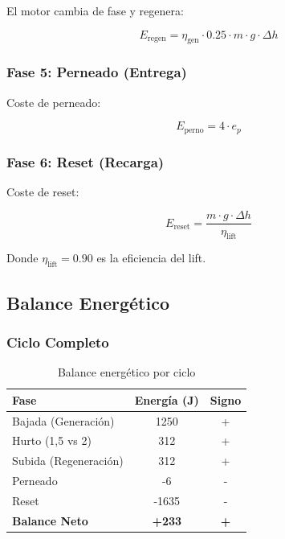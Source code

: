 \documentclass[12pt,a4paper]{article}
\begin{document}
El motor cambia de fase y regenera:

\begin{equation}
E_{\text{regen}} = \eta_{\text{gen}} \cdot 0.25 \cdot m \cdot g \cdot \Delta h
\end{equation}

\subsubsection{Fase 5: Perneado (Entrega)}

Coste de perneado:

\begin{equation}
E_{\text{perno}} = 4 \cdot e_p
\end{equation}

\subsubsection{Fase 6: Reset (Recarga)}

Coste de reset:

\begin{equation}
E_{\text{reset}} = \frac{m \cdot g \cdot \Delta h}{\eta_{\text{lift}}}
\end{equation}

Donde $\eta_{\text{lift}} = 0.90$ es la eficiencia del lift.

\subsection{Balance Energético}

\subsubsection{Ciclo Completo}

\begin{table}[H]
\centering
\caption{Balance energético por ciclo}
\label{tab:balance}
\begin{tabular}{@{}lcc@{}}
\toprule
\textbf{Fase} & \textbf{Energía (J)} & \textbf{Signo} \\
\midrule
Bajada (Generación) & 1250 & + \\
Hurto (1,5 vs 2) & 312 & + \\
Subida (Regeneración) & 312 & + \\
Perneado & -6 & - \\
Reset & -1635 & - \\
\bottomrule
\textbf{Balance Neto} & \textbf{+233} & \textbf{+} \\
\bottomrule
\end{tabular}
\end{table}
\end{document}
